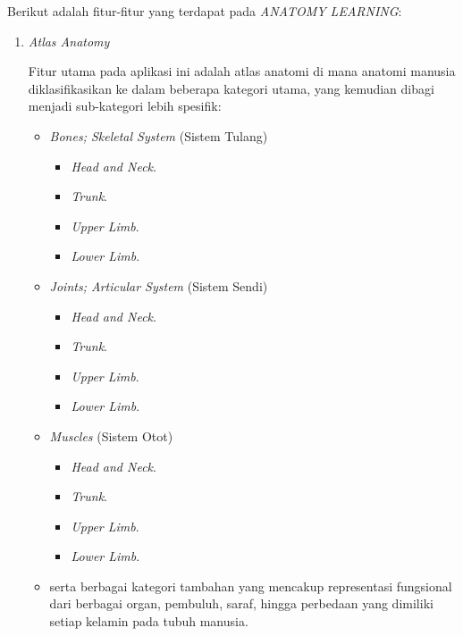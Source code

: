         Berikut adalah fitur-fitur yang terdapat pada \textit{ANATOMY LEARNING}:
    
         \begin{enumerate}
    		\item \textit{Atlas Anatomy}
            
                Fitur utama pada aplikasi ini adalah atlas anatomi di mana anatomi manusia diklasifikasikan ke dalam beberapa kategori utama, yang kemudian dibagi menjadi sub-kategori lebih spesifik:
                \begin{itemize}
                    \item \textit{Bones; Skeletal System }(Sistem Tulang)
                        \begin{itemize}
                            \item \textit{Head and Neck}.
                            \item \textit{Trunk}.
                            \item \textit{Upper Limb}.
                            \item \textit{Lower Limb}.
                        \end{itemize}
                    \item \textit{Joints; Articular System} (Sistem Sendi)
                        \begin{itemize}
                            \item \textit{Head and Neck}.
                            \item \textit{Trunk}.
                            \item \textit{Upper Limb}.
                            \item \textit{Lower Limb}.
                        \end{itemize}
                    \item {\textit{Muscles} (Sistem Otot)}
                        \begin{itemize}
                            \item \textit{Head and Neck}.
                            \item \textit{Trunk}.
                            \item \textit{Upper Limb}.
                            \item \textit{Lower Limb}.
                        \end{itemize}
                    \item serta berbagai kategori tambahan yang mencakup representasi fungsional dari berbagai organ, pembuluh, saraf, hingga perbedaan yang dimiliki setiap kelamin pada tubuh manusia.

\end{itemize}
\end{enumerate}
